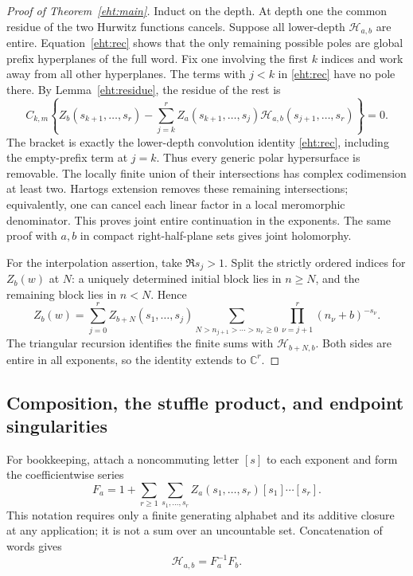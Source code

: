 \documentclass[11pt]{article}
\numberwithin{equation}{section}
\theoremstyle{plain}
\theoremstyle{definition}
\theoremstyle{remark}
\begin{document}
\begin{proof}[Proof of Theorem~\ref{eht:main}]
Induct on the depth.  At depth one the common residue of the two Hurwitz
functions cancels.  Suppose all lower-depth $\mathcal H_{a,b}$ are entire.
Equation~\eqref{eht:rec} shows that the only remaining possible poles are
global prefix hyperplanes of the full word.  Fix one involving the first
$k$ indices and work away from all other hyperplanes.  The terms with
$j<k$ in \eqref{eht:rec} have no pole there.  By
Lemma~\ref{eht:residue}, the residue of the rest is
\[
 C_{k,m}\left\{
 Z_b(s_{k+1},\ldots,s_r)
 -\sum_{j=k}^rZ_a(s_{k+1},\ldots,s_j)
                  \mathcal H_{a,b}(s_{j+1},\ldots,s_r)
 \right\}=0.
\]
The bracket is exactly the lower-depth convolution identity
\eqref{eht:rec}, including the empty-prefix term at $j=k$.
Thus every generic polar hypersurface is removable.  The locally finite
union of their intersections has complex codimension at least two.
Hartogs extension removes these remaining intersections; equivalently,
one can cancel each linear factor in a local meromorphic denominator.
This proves joint entire continuation in the exponents.  The same proof
with $a,b$ in compact right-half-plane sets gives joint holomorphy.

For the interpolation assertion, take $\Re s_j>1$.  Split the strictly
ordered indices for $Z_b(w)$ at $N$: a uniquely determined initial block
lies in $n\ge N$, and the remaining block lies in $n<N$.  Hence
\[
 Z_b(w)=\sum_{j=0}^rZ_{b+N}(s_1,\ldots,s_j)
   \sum_{N>n_{j+1}>\cdots>n_r\ge0}
                    \prod_{\nu=j+1}^r(n_\nu+b)^{-s_\nu}.
\]
The triangular recursion identifies the finite sums with
$\mathcal H_{b+N,b}$.  Both sides are entire in all exponents, so the
identity extends to $\mathbb C^r$.
\end{proof}

\subsection{Composition, the stuffle product, and endpoint singularities}

For bookkeeping, attach a noncommuting letter $[s]$ to each exponent and
form the coefficientwise series
\[
 F_a=1+\sum_{r\ge1}\sum_{s_1,\ldots,s_r}
             Z_a(s_1,\ldots,s_r)[s_1]\cdots[s_r].
\]
This notation requires only a finite generating alphabet and its additive
closure at any application; it is not a sum over an uncountable set.
Concatenation of words gives
\begin{equation}\label{eht:quotient}
 \mathcal H_{a,b}=F_a^{-1}F_b.
\end{equation}
\end{document}
